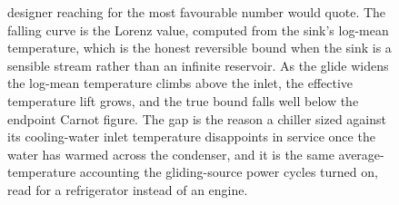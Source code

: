 \begin{figure}[htbp]
{designer reaching for the most favourable number would quote. The falling curve is
the Lorenz value, computed from the sink's log-mean temperature, which is the
honest reversible bound when the sink is a sensible stream rather than an infinite
reservoir. As the glide widens the log-mean temperature climbs above the inlet, the
effective temperature lift grows, and the true bound falls well below the endpoint
Carnot figure. The gap is the reason a chiller sized against its cooling-water
inlet temperature disappoints in service once the water has warmed across the
condenser, and it is the same average-temperature accounting the gliding-source
power cycles turned on, read for a refrigerator instead of an engine.}
\label{fig:vol04ch03:lorenz-bound}
\end{figure}
